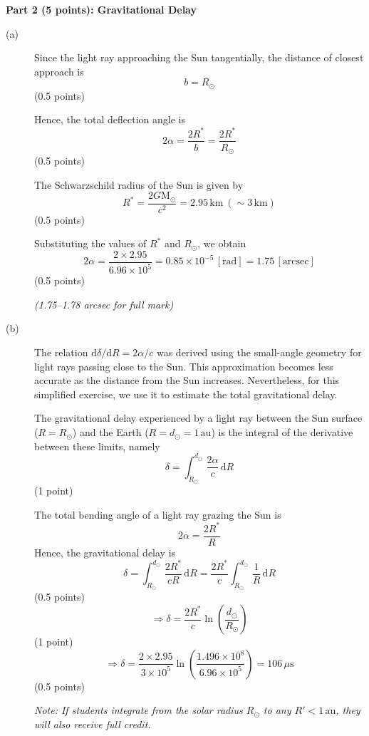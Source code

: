 \medskip\noindent\textbf{Part 2 (5 points): Gravitational Delay}

\begin{description}
\item[(a)] Since the light ray approaching the Sun tangentially, the distance
  of closest approach is
  \[ b = R_\odot \]
  \hfill(0.5 points)

  Hence, the total deflection angle is
  \[ 2\alpha = \frac{2R^*}{b} = \frac{2R^*}{R_\odot} \]
  \hfill(0.5 points)

  The Schwarzschild radius of the Sun is given by
  \[ R^* = \frac{2G\mathrm{M}_\odot}{c^2} = 2.95\,\mathrm{km}\ (\sim 3\,\mathrm{km}) \]
  \hfill(0.5 points)

  Substituting the values of $R^*$ and $R_\odot$, we obtain
  \[ 2\alpha = \frac{2 \times 2.95}{6.96 \times 10^5}
     = 0.85 \times 10^{-5}\,[\mathrm{rad}] = 1.75\,[\mathrm{arcsec}] \]
  \hfill(0.5 points)

  \textit{(1.75--1.78 arcsec for full mark)}

\item[(b)] The relation $\mathrm{d}\delta/\mathrm{d}R = 2\alpha/c$ was
  derived using the small-angle geometry for light rays passing close to the
  Sun. This approximation becomes less accurate as the distance from the Sun
  increases. Nevertheless, for this simplified exercise, we use it to estimate
  the total gravitational delay.

  The gravitational delay experienced by a light ray between the Sun surface
  ($R = R_\odot$) and the Earth ($R = d_\odot = 1\,\mathrm{au}$) is the
  integral of the derivative between these limits, namely
  \[ \delta = \int_{R_\odot}^{d_\odot} \frac{2\alpha}{c}\,\mathrm{d}R \]
  \hfill(1 point)

  The total bending angle of a light ray grazing the Sun is
  \[ 2\alpha = \frac{2R^*}{R} \]
  Hence, the gravitational delay is
  \[ \delta = \int_{R_\odot}^{d_\odot} \frac{2R^*}{cR}\,\mathrm{d}R
     = \frac{2R^*}{c}\int_{R_\odot}^{d_\odot} \frac{1}{R}\,\mathrm{d}R \]
  \hfill(0.5 points)
  \[ \Rightarrow \delta = \frac{2R^*}{c}\ln\left(\frac{d_\odot}{R_\odot}\right) \]
  \hfill(1 point)
  \[ \Rightarrow \delta = \frac{2 \times 2.95}{3 \times 10^5}
     \ln\left(\frac{1.496 \times 10^8}{6.96 \times 10^5}\right)
     = 106\,\mu\mathrm{s} \]
  \hfill(0.5 points)

  \textit{Note: If students integrate from the solar radius $R_\odot$ to any
  $R' < 1\,\mathrm{au}$, they will also receive full credit.}
\end{description}

